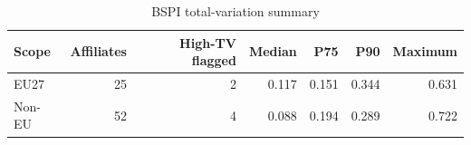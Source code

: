 \begin{table}[H]
\centering
\footnotesize
\setlength{\tabcolsep}{3pt}
\caption{BSPI total-variation summary}
\label{tab:app_stage1_bspi_tv}
\begin{tabular}{@{}lrrrrrr@{}}
\toprule
Scope & Affiliates & High-TV flagged & Median & P75 & P90 & Maximum \\
\midrule
EU27 & 25 & 2 & 0.117 & 0.151 & 0.344 & 0.631 \\
Non-EU & 52 & 4 & 0.088 & 0.194 & 0.289 & 0.722 \\
\bottomrule
\end{tabular}
\end{table}
